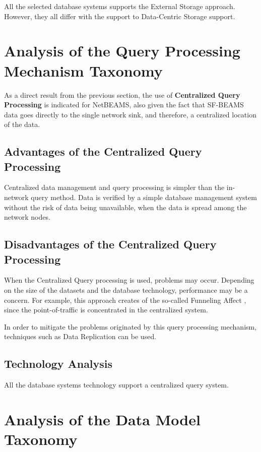 All the selected database systems supports the External Storage approach.
However, they all differ with the support to Data-Centric Storage support.

\section{Analysis of the Query Processing Mechanism Taxonomy}

As a direct result from the previous section, the use of \textbf{Centralized Query
Processing} is indicated for NetBEAMS, also given the fact that SF-BEAMS data
goes directly to the single network sink, and therefore, a centralized location
of the data.

\subsection{Advantages of the Centralized Query Processing}

Centralized data management and query processing is simpler than the in-network
query method. Data is verified by a simple database management system without
the risk of data being unavailable, when the data is spread among the network
nodes.

\subsection{Disadvantages of the Centralized Query Processing}

When the Centralized Query processing is used, problems may occur. Depending
on the size of the datasets and the database technology, performance may be a
concern. For example, this approach creates of the so-called Funneling
Affect \cite{sn-storage04}, since the point-of-traffic is concentrated in the
centralized system.

In order to mitigate the problems originated by this query processing
mechanism, techniques such as Data Replication can be used.

\subsection{Technology Analysis}

All the database systems technology support a centralized query system.

\section{Analysis of the Data Model Taxonomy}

